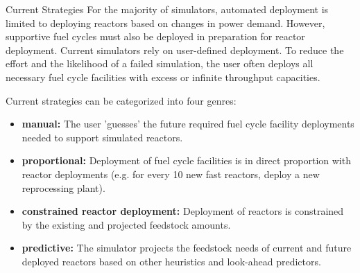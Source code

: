 \documentclass[final]{beamer}
\newlength{\onecolwid}
\newlength{\twocolwid}
\begin{document}
\begin{frame}[t]
\begin{columns}[t]
\begin{column}{\twocolwid}
\begin{columns}[t,totalwidth=\twocolwid]
\begin{column}{\onecolwid}
\begin{block}{Current Strategies}
For the majority of simulators, automated deployment is limited to deploying reactors based
on changes in power demand. However, supportive fuel cycles must also be deployed in preparation for
reactor deployment. Current simulators rely on user-defined deployment. To reduce the effort and
the likelihood of a failed simulation, the user often deploys all necessary fuel cycle facilities
with excess or infinite throughput capacities.

Current strategies can be categorized into four genres:
\begin{itemize}
\item \textbf{manual:} The user 'guesses' the future required fuel cycle facility deployments needed to support simulated reactors.
\item \textbf{proportional:} Deployment of fuel cycle facilities is in direct proportion with reactor deployments (e.g. for every 10 new fast reactors, deploy a new reprocessing plant).
\item \textbf{constrained reactor deployment:} Deployment of reactors is constrained by the existing and projected feedstock amounts.
\item \textbf{predictive:} The simulator projects the feedstock needs of current and future deployed reactors based on other heuristics and look-ahead predictors.
\end{itemize}

\end{block}


\end{column} %

\end{columns} %



\begin{columns}[t,totalwidth=\twocolwid] %


\end{columns}
\end{column}
\end{columns}
\end{frame}
\end{document}
